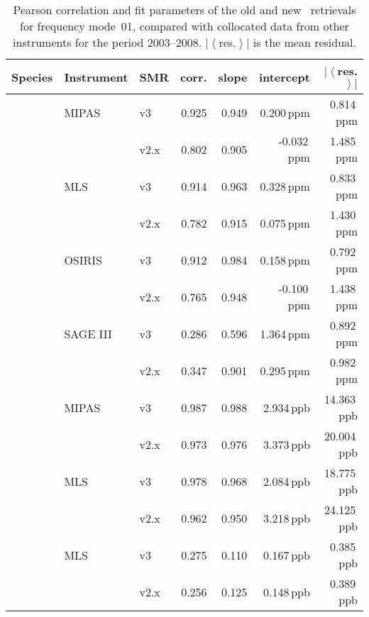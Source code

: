 \begin{table}[tbhp]
\centering
\caption{Pearson correlation and fit parameters of the old and new \smr\
retrievals for frequency mode~01, compared with collocated data from other
instruments for the period 2003--2008. $\left|\left<\right.\right.$res.$\left.\left.\right>\right|$ is the mean residual.
}
\label{tab:fm01:stats}
\begin{tabular}{lllrrrr}
    \toprule
    \textbf{Species} & \textbf{Instrument} & \textbf{SMR} & \textbf{corr.} & \textbf{slope} & \textbf{intercept} & \textbf{$\left|\left<\right.\right.$res.$\left.\left.\right>\right|$} \\
    \midrule
    \chem{O3}   & MIPAS     & v3    & 0.925 & 0.949 & 0.200\,ppm    &  0.814\,ppm \\
                &           & v2.x  & 0.802 & 0.905 & -0.032\,ppm   &  1.485\,ppm \\
    \cline{2-7}
                & MLS       & v3    & 0.914 & 0.963 & 0.328\,ppm    &  0.833\,ppm \\
                &           & v2.x  & 0.782 & 0.915 & 0.075\,ppm    &  1.430\,ppm \\
    \cline{2-7}
                & OSIRIS    & v3    & 0.912 & 0.984 & 0.158\,ppm    &  0.792\,ppm \\
                &           & v2.x  & 0.765 & 0.948 & -0.100\,ppm   &  1.438\,ppm \\
    \cline{2-7}
                & SAGE III  & v3    & 0.286 & 0.596 & 1.364\,ppm    &  0.892\,ppm \\
                &           & v2.x  & 0.347 & 0.901 & 0.295\,ppm    &  0.982\,ppm \\
    \midrule
    \chem{N_2O} & MIPAS     & v3    & 0.987 & 0.988 & 2.934\,ppb    & 14.363\,ppb \\
                &           & v2.x  & 0.973 & 0.976 & 3.373\,ppb    & 20.004\,ppb \\
    \cline{2-7}
                & MLS       & v3    & 0.978 & 0.968 & 2.084\,ppb    & 18.775\,ppb \\
                &           & v2.x  & 0.962 & 0.950 & 3.218\,ppb    & 24.125\,ppb \\
    \midrule
    \chem{ClO}  & MLS       & v3    & 0.275 & 0.110 & 0.167\,ppb    &  0.385\,ppb \\
                &           & v2.x  & 0.256 & 0.125 & 0.148\,ppb    &  0.389\,ppb \\
    \bottomrule
\end{tabular}
\end{table}

